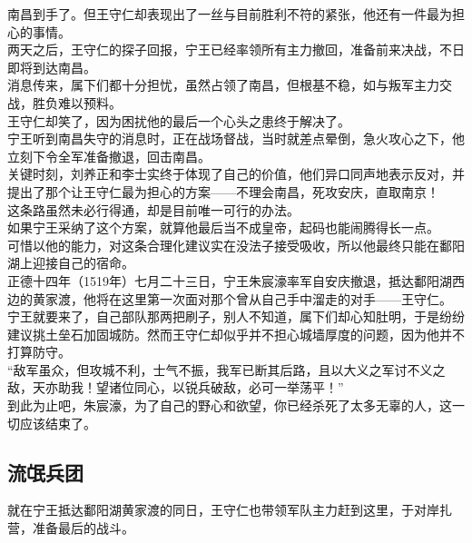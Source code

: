 \begin{multicols}{\theparacolNo}
南昌到手了。但王守仁却表现出了一丝与目前胜利不符的紧张，他还有一件最为担心的事情。\\

两天之后，王守仁的探子回报，宁王已经率领所有主力撤回，准备前来决战，不日即将到达南昌。\\

消息传来，属下们都十分担忧，虽然占领了南昌，但根基不稳，如与叛军主力交战，胜负难以预料。\\

王守仁却笑了，因为困扰他的最后一个心头之患终于解决了。\\

宁王听到南昌失守的消息时，正在战场督战，当时就差点晕倒，急火攻心之下，他立刻下令全军准备撤退，回击南昌。\\

关键时刻，刘养正和李士实终于体现了自己的价值，他们异口同声地表示反对，并提出了那个让王守仁最为担心的方案——不理会南昌，死攻安庆，直取南京！\\

这条路虽然未必行得通，却是目前唯一可行的办法。\\

如果宁王采纳了这个方案，就算他最后当不成皇帝，起码也能闹腾得长一点。\\

可惜以他的能力，对这条合理化建议实在没法子接受吸收，所以他最终只能在鄱阳湖上迎接自己的宿命。\\

正德十四年（1519年）七月二十三日，宁王朱宸濠率军自安庆撤退，抵达鄱阳湖西边的黄家渡，他将在这里第一次面对那个曾从自己手中溜走的对手——王守仁。\\

宁王就要来了，自己部队那两把刷子，别人不知道，属下们却心知肚明，于是纷纷建议挑土垒石加固城防。然而王守仁却似乎并不担心城墙厚度的问题，因为他并不打算防守。\\

“敌军虽众，但攻城不利，士气不振，我军已断其后路，且以大义之军讨不义之敌，天亦助我！望诸位同心，以锐兵破敌，必可一举荡平！”\\

到此为止吧，朱宸濠，为了自己的野心和欲望，你已经杀死了太多无辜的人，这一切应该结束了。\\

\subsection{流氓兵团}
就在宁王抵达鄱阳湖黄家渡的同日，王守仁也带领军队主力赶到这里，于对岸扎营，准备最后的战斗。\\


\end{multicols}
